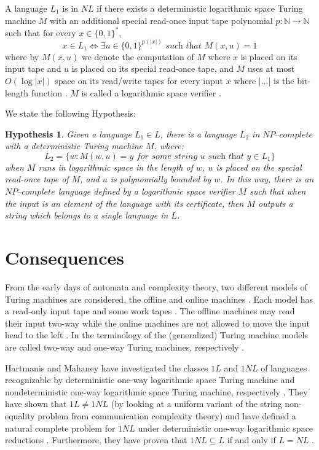 \documentclass[a4paper,UKenglish,cleveref, autoref]{lipics-v2019}
\newtheorem{hypothesis}[theorem]{Hypothesis}
\begin{document}
\begin{definition}
A language $L_{1}$ is in $NL$ if there exists a deterministic logarithmic space Turing machine $M$ with an additional special read-once input tape polynomial $p: \mathbb{N} \rightarrow \mathbb{N}$ such that for every $x \in \{0, 1\}^{*}$,
\[x \in L_{1} \Leftrightarrow \exists u \in \{0, 1\}^{p(|x|)} \textit{ such that } M(x, u) = 1 \]
where by $M(x, u)$ we denote the computation of $M$ where $x$ is placed on its input tape and $u$ is placed on its special read-once tape, and $M$ uses at most $O(\log |x|)$ space on its read/write tapes for every input $x$ where $|\ldots|$ is the bit-length function \cite{AB09}. $M$ is called a logarithmic space verifier \cite{AB09}.
\end{definition}

We state the following Hypothesis:

\begin{hypothesis}
\label{hypothesis}
Given a language $L_{1} \in L$, there is a language $L_{2}$ in $\textit{NP--complete}$ with a deterministic Turing machine $M$, where:
\[L_{2} = \{w: M(w, u) = y \textit{ for some string } u \textit{ such that } y \in L_{1}\}\]
when $M$ runs in logarithmic space in the length of $w$, $u$ is placed on the special read-once tape of $M$, and $u$ is polynomially bounded by $w$. In this way, there is an $\textit{NP--complete}$ language defined by a logarithmic space verifier $M$ such that when the input is an element of the language with its certificate, then $M$ outputs a string which belongs to a single language in $L$.
\end{hypothesis}

\section{Consequences}

From the early days of automata and complexity  theory,  two  different  models  of  Turing  machines  are  considered, the offline and online machines \cite{KU15}. Each model has a read-only input tape and some work tapes \cite{KU15}. The offline machines may read their input two-way while the online machines are not allowed to move the input head to the left \cite{KU15}. In the terminology of the (generalized) Turing machine models are called two-way and one-way Turing machines, respectively \cite{KU15}.

Hartmanis and Mahaney have investigated the classes $1L$ and $1NL$ of languages recognizable by deterministic one-way logarithmic space Turing machine and nondeterministic one-way logarithmic space Turing machine, respectively \cite{HM81}. They have shown that $1L \neq 1NL$ (by looking at a uniform variant of the string non-equality problem from communication complexity theory) and have defined a natural complete problem for $1NL$ under deterministic one-way logarithmic space reductions \cite{HM81}. Furthermore, they have proven that $1NL \subseteq L$ if and only if $L=NL$ \cite{HM81}.
\end{document}

